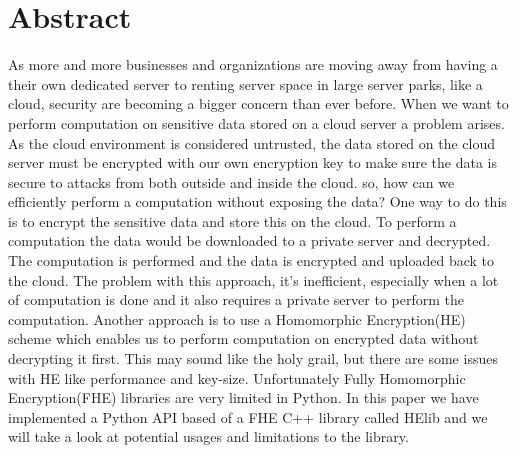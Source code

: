 \chapter*{Abstract}
As more and more businesses and organizations are moving away from having a their own dedicated server to renting server space in large server parks, like a cloud, security are becoming a bigger concern than ever before. When we want to perform computation on sensitive data stored on a cloud server a problem arises. As the cloud environment is considered untrusted, the data stored on the cloud server must be encrypted with our own encryption key to make sure the data is secure to attacks from both outside and inside the cloud. so, how can we efficiently perform a computation without exposing the data? One way to do this is to encrypt the sensitive data and store this on the cloud. To perform a computation the data would be downloaded to a private server and decrypted. The computation is performed and the data is encrypted and uploaded back to the cloud. The problem with this approach, it's  inefficient, especially when a lot of computation is done and it also requires a private server to perform the computation. Another approach is to use a Homomorphic Encryption(HE) scheme which enables us to perform computation on encrypted data without decrypting it first. This may sound like the holy grail, but there are some issues with HE like performance and key-size. Unfortunately Fully Homomorphic Encryption(FHE) libraries are very limited in Python. In this paper we have implemented a Python API based of a FHE C++ library called HElib and we will take a look at potential usages and limitations to the library. 

